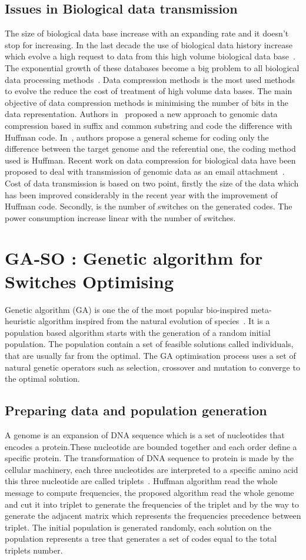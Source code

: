 \documentclass[preprint,12pt]{elsarticle}
\begin{document}
\subsection{Issues in Biological data transmission}
The size of biological data base increase with an expanding rate and it doesn't stop for increasing. In the last decade the use of biological data history increase which evolve a high request to data from this high volume biological data base~\cite{Doug08}. The exponential growth of these databases become a big problem to all biological data processing methods~\cite{Doug08}. Data compression methods is the most used methods to evolve the reduce the cost of treatment of high volume data bases. The main objective of data compression methods is minimising the number of bits in the data representation. Authors in~\cite{bra09} proposed a new approach to genomic data compression based in suffix and common substring and code the difference with Huffman code. In~\cite{chr09}, authors propose a general scheme for coding only the difference between the target genome and the referential one, the coding method used is Huffman. Recent work on data compression for biological data have been proposed to deal with transmission of genomic data as an email attachment~\cite{wan11}. Cost of data transmission is based on two point, firstly the size of the data which has been improved considerably in the recent year with the improvement of Huffman code. Secondly, is the number of switches on the generated codes. The power consumption increase linear with the number of switches.
\section{GA-SO : Genetic algorithm for Switches Optimising}
Genetic algorithm (GA) is one the of the most popular bio-inspired meta-heuristic algorithm inspired from the natural evolution of species~\cite{gen1}. It is a  population based algorithm starts with the generation of a random initial population. The population contain a set of feasible solutions called individuals, that are usually far from the optimal. The GA optimisation process uses a set of natural genetic operators such as selection, crossover and mutation to converge to the optimal solution.
\subsection{Preparing data and population generation}
A genome is an expansion of DNA sequence which is a set of nucleotides that encodes a protein.These nucleotide are bounded together and each order define a specific protein. The transformation of DNA sequence to protein  is made by the cellular machinery, each three nucleotides are interpreted to a specific amino acid this three nucleotide are called triplets~\cite{Harvey00}. Huffman algorithm read the whole message to compute frequencies, the proposed algorithm read the whole genome and cut it into triplet to generate the frequencies of the triplet and by the way to generate the adjacent matrix which represents the frequencies precedence between triplet. The initial population is generated randomly, each solution on the population represents a tree that generates a set of codes equal to the total triplets number.
\end{document}
